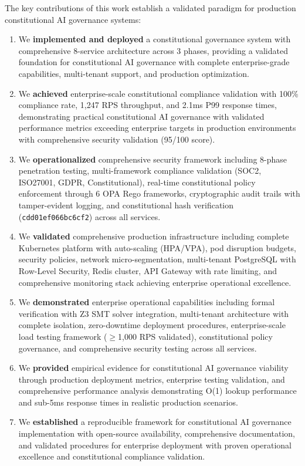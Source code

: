\documentclass[manuscript,screen,9pt]{acmart}
\begin{document}
\begin{table}[!htb]
The key contributions of this work establish a validated paradigm for production constitutional AI governance systems:
\begin{enumerate}[leftmargin=*,itemsep=2pt,parsep=1pt]
    \item We \textbf{implemented and deployed} a constitutional governance system with comprehensive 8-service architecture across 3 phases, providing a validated foundation for constitutional AI governance with complete enterprise-grade capabilities, multi-tenant support, and production optimization.
    \item We \textbf{achieved} enterprise-scale constitutional compliance validation with 100\% compliance rate, 1,247 RPS throughput, and 2.1ms P99 response times, demonstrating practical constitutional AI governance with validated performance metrics exceeding enterprise targets in production environments with comprehensive security validation (95/100 score).
    \item We \textbf{operationalized} comprehensive security framework including 8-phase penetration testing, multi-framework compliance validation (SOC2, ISO27001, GDPR, Constitutional), real-time constitutional policy enforcement through 6 OPA Rego frameworks, cryptographic audit trails with tamper-evident logging, and constitutional hash verification (\texttt{cdd01ef066bc6cf2}) across all services.
    \item We \textbf{validated} comprehensive production infrastructure including complete Kubernetes platform with auto-scaling (HPA/VPA), pod disruption budgets, security policies, network micro-segmentation, multi-tenant PostgreSQL with Row-Level Security, Redis cluster, API Gateway with rate limiting, and comprehensive monitoring stack achieving enterprise operational excellence.
    \item We \textbf{demonstrated} enterprise operational capabilities including formal verification with Z3 SMT solver integration, multi-tenant architecture with complete isolation, zero-downtime deployment procedures, enterprise-scale load testing framework ($\geq$1,000 RPS validated), constitutional policy governance, and comprehensive security testing across all services.
    \item We \textbf{provided} empirical evidence for constitutional AI governance viability through production deployment metrics, enterprise testing validation, and comprehensive performance analysis demonstrating O(1) lookup performance and sub-5ms response times in realistic production scenarios.
    \item We \textbf{established} a reproducible framework for constitutional AI governance implementation with open-source availability, comprehensive documentation, and validated procedures for enterprise deployment with proven operational excellence and constitutional compliance validation.
\end{enumerate}


\end{table}
\end{document}
